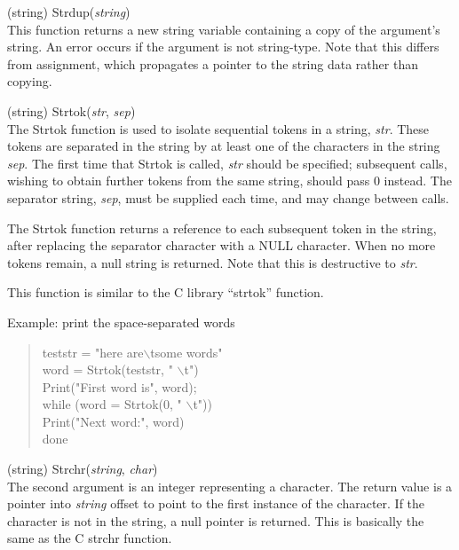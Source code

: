 \begin{description}
\item{(string) \vt Strdup({\it string\/})}\\
This function returns a new string variable containing a copy of the
argument's string.  An error occurs if the argument is not
string-type.  Note that this differs from assignment, which propagates
a pointer to the string data rather than copying.

\item{(string) \vt Strtok({\it str\/}, {\it sep\/})}\\
The {\vt Strtok} function is used to isolate sequential tokens in a
string, {\it str\/}.  These tokens are separated in the string by at
least one of the characters in the string {\it sep\/}.  The first time
that {\vt Strtok} is called, {\it str} should be specified; subsequent
calls, wishing to obtain further tokens from the same string, should
pass 0 instead.  The separator string, {\it sep}, must be supplied
each time, and may change between calls.

The {\vt Strtok} function returns a reference to each subsequent token
in the string, after replacing the separator character with a NULL
character.  When no more tokens remain, a null string is returned. 
Note that this is destructive to {\it str}.

This function is similar to the C library ``{\vt strtok}'' function.

Example:  print the space-separated words
\begin{quote}\vt
  teststr = "here are$\backslash$tsome   words"\\
  word = Strtok(teststr, " $\backslash$t")\\
  Print("First word is", word);\\
  while (word = Strtok(0, " $\backslash$t"))\\
  \hspace*{2em} Print("Next word:", word)\\
  done\\
\end{quote}

\item{(string) \vt Strchr({\it string\/}, {\it char\/})}\\
The second argument is an integer representing a character.  The
return value is a pointer into {\it string} offset to point to the
first instance of the character.  If the character is not in the
string, a null pointer is returned.  This is basically the same as the
C {\vt strchr} function.


\end{description}
